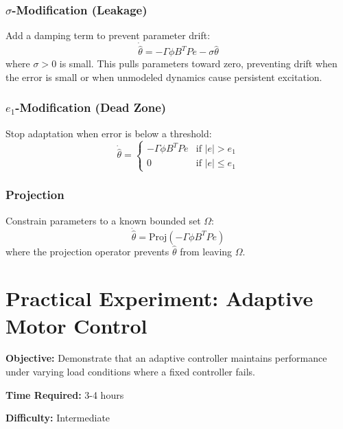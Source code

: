 \subsubsection{$\sigma$-Modification (Leakage)}

Add a damping term to prevent parameter drift:
\begin{equation}
\dot{\hat{\theta}} = -\Gamma \phi B^T P e - \sigma \hat{\theta}
\label{eq:sigma_mod}
\end{equation}
where $\sigma > 0$ is small. This pulls parameters toward zero, preventing drift when the error is small or when unmodeled dynamics cause persistent excitation.

\subsubsection{$e_1$-Modification (Dead Zone)}

Stop adaptation when error is below a threshold:
\begin{equation}
\dot{\hat{\theta}} = \begin{cases}
-\Gamma \phi B^T P e & \text{if } |e| > e_1 \\
0 & \text{if } |e| \leq e_1
\end{cases}
\label{eq:e1_mod}
\end{equation}

\subsubsection{Projection}

Constrain parameters to a known bounded set $\Omega$:
\begin{equation}
\dot{\hat{\theta}} = \text{Proj}(-\Gamma \phi B^T P e)
\label{eq:projection}
\end{equation}
where the projection operator prevents $\hat{\theta}$ from leaving $\Omega$.

\section{Practical Experiment: Adaptive Motor Control}
\label{sec:adaptive_experiment}

\begin{experimentbox}[title=Adaptive DC Motor Speed Control with Variable Load, sharp corners]
\textbf{Objective:} Demonstrate that an adaptive controller maintains performance under varying load conditions where a fixed controller fails.

\textbf{Time Required:} 3-4 hours

\textbf{Difficulty:} Intermediate
\end{experimentbox}

